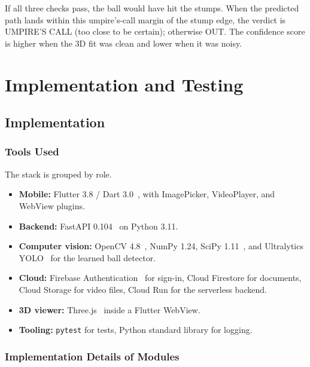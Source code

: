 \documentclass[12pt,a4paper]{report}
\begin{document}
If all three checks pass, the ball would have hit the stumps. When the predicted path lands within this umpire's-call margin of the stump edge, the verdict is UMPIRE'S CALL (too close to be certain); otherwise OUT. The confidence score is higher when the 3D fit was clean and lower when it was noisy.

\chapter{Implementation and Testing}

\section{Implementation}

\subsection{Tools Used}

The stack is grouped by role.

\begin{itemize}
    \item \textbf{Mobile:} Flutter 3.8 / Dart 3.0~\cite{flutter}, with ImagePicker, VideoPlayer, and WebView plugins.
    \item \textbf{Backend:} FastAPI 0.104~\cite{fastapi} on Python 3.11.
    \item \textbf{Computer vision:} OpenCV 4.8~\cite{bradski2008}, NumPy 1.24, SciPy 1.11~\cite{scipy2020}, and Ultralytics YOLO~\cite{ultralytics2023} for the learned ball detector.
    \item \textbf{Cloud:} Firebase Authentication~\cite{firebase} for sign-in, Cloud Firestore for documents, Cloud Storage for video files, Cloud Run for the serverless backend.
    \item \textbf{3D viewer:} Three.js~\cite{threejs} inside a Flutter WebView.
    \item \textbf{Tooling:} \texttt{pytest} for tests, Python standard library for logging.
\end{itemize}

\subsection{Implementation Details of Modules}
\end{document}
